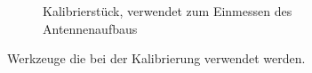 \begin{figure}[h]
\begin{subfigure}[h]{0.4\textwidth}
                 \caption{Kalibrierstück, verwendet zum Einmessen des Antennenaufbaus}
                 \label{fig:calib_piece}
         \end{subfigure}
         \caption{Werkzeuge die bei der Kalibrierung verwendet werden.}
         \label{fig:Calibration_Tools}
\end{figure}
 